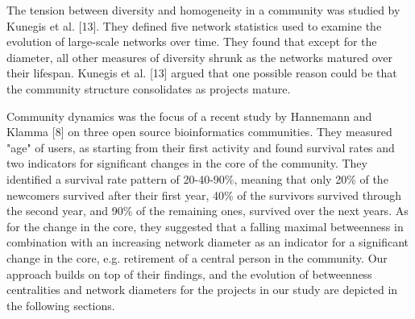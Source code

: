 \documentclass[ifip]{svmult}
\begin{document}
The tension between diversity and homogeneity in a community was studied by Kunegis et al. [13]. They defined five network statistics used to examine the evolution of large-scale networks over time. They found that except for the diameter, all other measures of diversity shrunk as the networks matured over their lifespan. Kunegis et al. [13] argued that one possible reason could be that the community structure consolidates as projects mature.


Community dynamics was the focus of a recent study by Hannemann and Klamma [8] on three open source bioinformatics communities. They measured "age" of users, as starting from their first activity and found survival rates and two indicators for significant changes in the core of the community. They identified a survival rate pattern of 20-40-90\%, meaning that only 20\% of the newcomers survived after their first year, 40\% of the survivors survived through the second year, and 90\% of the remaining ones, survived over the next years. As for the change in the core, they suggested that a falling maximal betweenness in combination with an increasing network diameter as an indicator for a significant change in the core, e.g. retirement of a central person in the community. Our approach builds on top of their findings, and the evolution of betweenness centralities and network diameters for the projects in our study are depicted in the following sections.
\end{document}
